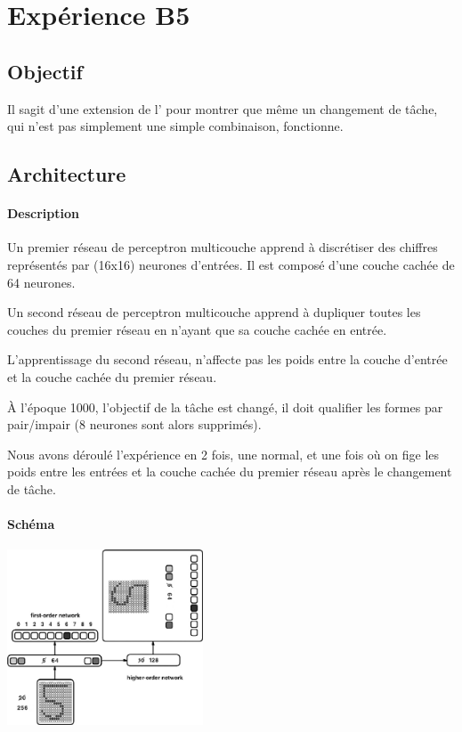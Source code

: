 \section{Expérience B5} \label{expB5}
  \subsection{Objectif}
  Il sagit d'une extension de l' pour montrer que même un changement de tâche,
  qui n'est pas simplement une simple combinaison, fonctionne.
  
  \subsection{Architecture}
    \paragraph{Description}
      Un premier réseau de perceptron multicouche apprend à discrétiser des chiffres représentés
      par (16x16) neurones d'entrées. Il est composé d'une couche cachée de 64 neurones.
      
      Un second réseau de perceptron multicouche apprend à dupliquer toutes les couches du premier
      réseau en n'ayant que sa couche cachée en entrée.
      
      L'apprentissage du second réseau, n'affecte pas les poids entre la couche d'entrée et la 
      couche cachée du premier réseau.
      
      À l'époque 1000, l'objectif de la tâche est changé, il doit qualifier les formes par pair/impair (8 neurones sont alors supprimés).
      
      
      Nous avons déroulé l'expérience en 2 fois, une normal, et une fois où on fige les poids
      entre les entrées et la couche cachée du premier réseau après le changement de tâche.
    \paragraph{Schéma}
      \begin{center}
	\includegraphics[width=220px]{data/expA3/schema.png}
      \end{center}
      
